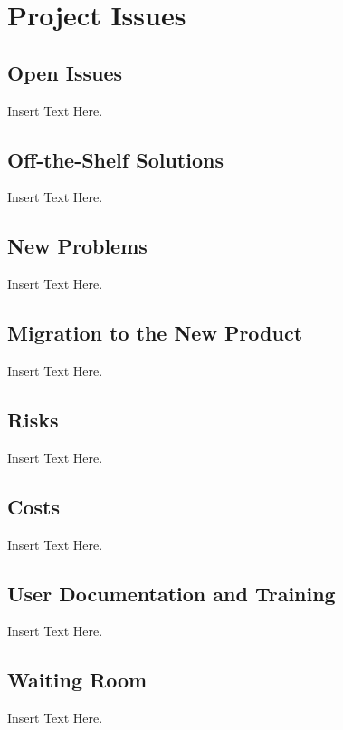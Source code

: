\documentclass [12pt]{article}
\begin{document}

\section {Project Issues} 


\subsection{Open Issues}
	Insert Text Here.

\subsection{Off-the-Shelf Solutions}
	Insert Text Here.

\subsection{New Problems}
	Insert Text Here.

\subsection{Migration to the New Product} 
	Insert Text Here.

\subsection{Risks}
	Insert Text Here.
	
\subsection{Costs}	
	Insert Text Here.

\subsection{User Documentation and Training}
	Insert Text Here.

\subsection{Waiting Room}
	Insert Text Here. 
\end{document}

